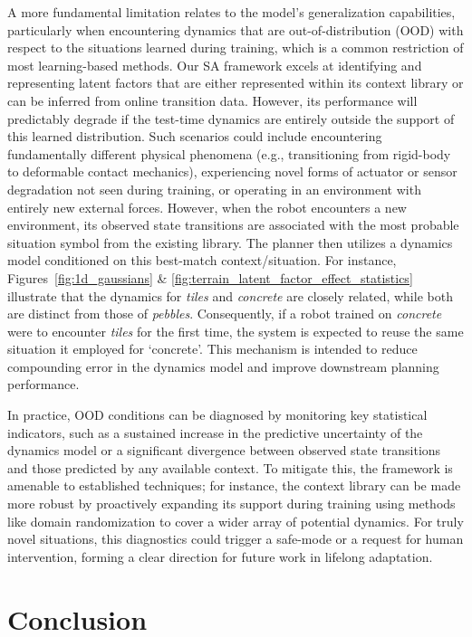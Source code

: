 \documentclass[Afour,sageh,times]{sagej}
\theoremstyle{lemma}
\begin{document}
A more fundamental limitation relates to the model's generalization capabilities, particularly when encountering dynamics that are out-of-distribution (OOD) with respect to the situations learned during training, which is a common restriction of most learning-based methods. Our SA framework excels at identifying and representing latent factors that are either represented within its context library or can be inferred from online transition data. However, its performance will predictably degrade if the test-time dynamics are entirely outside the support of this learned distribution. Such scenarios could include encountering fundamentally different physical phenomena (e.g., transitioning from rigid-body to deformable contact mechanics), experiencing novel forms of actuator or sensor degradation not seen during training, or operating in an environment with entirely new external forces. However, when the robot encounters a new environment, its observed state transitions are associated with the most probable situation symbol from the existing library. The planner then utilizes a dynamics model conditioned on this best-match context/situation. For instance, Figures~\ref{fig:1d_gaussians} \& \ref{fig:terrain_latent_factor_effect_statistics} illustrate that the dynamics for \textit{tiles} and \textit{concrete} are closely related, while both are distinct from those of \textit{pebbles}. Consequently, if a robot trained on \textit{concrete} were to encounter \textit{tiles} for the first time, the system is expected to reuse the same situation it employed for `concrete'. This mechanism is intended to reduce compounding error in the dynamics model and improve downstream planning performance.

In practice, OOD conditions can be diagnosed by monitoring key statistical indicators, such as a sustained increase in the predictive uncertainty of the dynamics model or a significant divergence between observed state transitions and those predicted by any available context. To mitigate this, the framework is amenable to established techniques; for instance, the context library can be made more robust by proactively expanding its support during training using methods like domain randomization to cover a wider array of potential dynamics. For truly novel situations, this diagnostics could trigger a safe-mode or a request for human intervention, forming a clear direction for future work in lifelong adaptation.

\section{Conclusion} \label{sec:conclusion}
\end{document}
